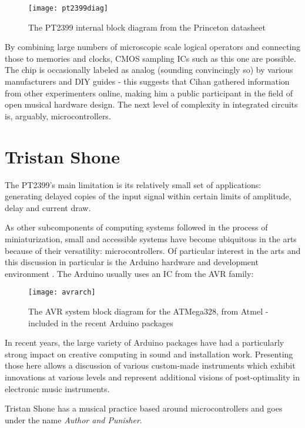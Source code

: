 	\begin{figure}[H]
	  \caption{The PT2399 internal block diagram from the Princeton datasheet}
	  \centering
	    \texttt{[image: pt2399diag]}
	\end{figure}

By combining large numbers of microscopic scale logical operators and connecting those to memories and clocks, CMOS sampling ICs such as this one are possible. The chip is occasionally labeled as analog (sounding convincingly so) by various manufacturers and DIY guides - this suggests that Cihan gathered information from other experimenters online, making him a public participant in the field of open musical hardware design. The next level of complexity in integrated circuits is, arguably, microcontrollers. 
 
\section{Tristan Shone}

The PT2399's main limitation is its relatively small set of applications: generating delayed copies of the input signal within certain limits of amplitude, delay and current draw. 

As other subcomponents of computing systems followed in the process of miniaturization, small and accessible systems have become ubiquitous in the arts because of their versatility: microcontrollers. Of particular interest in the arts and this discussion in particular is the Arduino hardware and development environment \citep{gibb2010}. The Arduino usually uses an IC from the AVR family: 

	\begin{figure}[H]
	  \caption{The AVR system block diagram for the ATMega328, from Atmel - included in the recent Arduino packages}
	  \centering
	    \texttt{[image: avrarch]}
	\end{figure}

In recent years, the large variety of Arduino packages have had a particularly strong impact on creative computing in sound and installation work. Presenting those here allows a discussion of various custom-made instruments which exhibit innovations at various levels and represent additional visions of post-optimality in electronic music instruments. 

Tristan Shone has a musical practice based around microcontrollers and goes under the name \emph{Author and Punisher}. 

